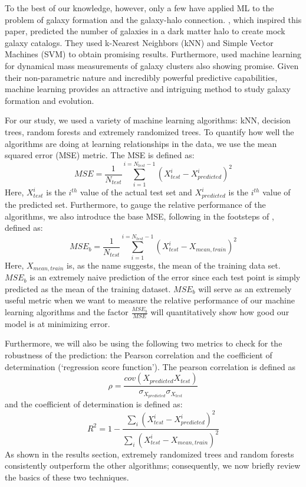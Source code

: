 \documentclass[a4paper,fleqn,usenatbib]{mnras}
\begin{document}
\par To the best of our knowledge, however, only a few have applied ML to the problem of galaxy formation and the galaxy-halo connection. \citet{xu2013first}, which inspired this paper, predicted the number of galaxies in a dark matter halo to create mock galaxy catalogs. They used k-Nearest Neighbors (kNN) and Simple Vector Machines (SVM) to obtain promising results. Furthermore, \citet{ntampaka2015machine} used machine learning for dynamical mass measurements of galaxy clusters also showing promise. Given their non-parametric nature and incredibly powerful predictive capabilities, machine learning provides an attractive and intriguing method to study galaxy formation and evolution. 
\par For our study, we used a variety of machine learning algorithms: kNN, decision trees, random forests and extremely randomized trees. To quantify how well the algorithms are doing at learning relationships in the data, we use the mean squared error (MSE) metric. The MSE is defined as: 
\begin{equation}
MSE = \frac{1}{N_{test}}\sum_{i=1}^{i=N_{test}-1} \left(X_{test}^{i} - X_{predicted}^{i}\right)^2
\end{equation} 
Here, $X_{test}^i$ is the $i^{th}$ value of the actual test set and $X_{predicted}^i$ is the $i^{th}$ value of the predicted set. Furthermore, to gauge the relative performance of the algorithms, we also introduce the base MSE, following in the footsteps of \citet{xu2013first}, defined as:
\begin{equation}
MSE_b = \frac{1}{N_{test}}\sum_{i=1}^{i=N_{test}-1} \left(X_{test}^{i} - X_{mean,train}\right)^2
\end{equation}
Here, $X_{mean,train}$ is, as the name suggests, the mean of the training data set. $MSE_b$ is an extremely naive prediction of the error since each test point is simply predicted as the mean of the training dataset. $MSE_b$ will serve as an extremely useful metric when we want to measure the relative performance of our machine learning algorithms and the factor $\frac{MSE_b}{MSE}$ will quantitatively show how good our model is at minimizing error. 

\par 
Furthermore, we will also be using the following two metrics to check for the robustness of the prediction: the Pearson correlation and the coefficient of determination (`regression score function'). The pearson correlation is defined as 
\begin{equation}
\rho = \frac{cov(X_{predicted} X_{test})}{\sigma_{X_{predicted}} \sigma_{X_{test}}}
\end{equation}
 and the coefficient of determination is defined as: 
 \begin{equation}
 R^2 = 1 - \frac{\sum_i (X_{test}^i - X_{predicted}^i)^2}{\sum_i (X_{test}^i - X_{mean,train})^2}
 \end{equation}
 As shown in the results section, extremely randomized trees and random forests consistently outperform the other algorithms; consequently, we now briefly review the basics of these two techniques. 
 
\end{document}
